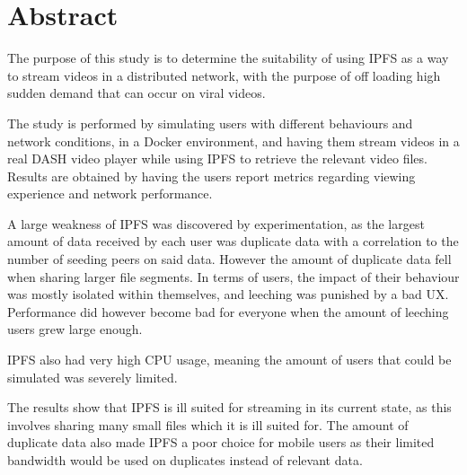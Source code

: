 \begingroup
\let\clearpage\relax
\let\cleardoublepage\relax
\let\cleardoublepage\relax

\chapter*{Abstract}
The purpose of this study is to determine the suitability of using \acs{IPFS} as a way to stream videos in a distributed network, with the purpose of off loading  high sudden demand that can occur on viral videos.

The study is performed by simulating users with different behaviours and network conditions, in a Docker environment, and having them stream videos in a real \acs{DASH} video player while using \acs{IPFS} to retrieve the relevant video files. Results are obtained by having the users report metrics regarding viewing experience and network performance.

A large weakness of \acs{IPFS} was discovered by experimentation, as the largest amount of data received by each user was duplicate data with a correlation to the number of seeding peers on said data. However the amount of duplicate data fell when sharing larger file segments. In terms of users, the impact of their behaviour was mostly isolated within themselves, and leeching was punished by a bad \acl{UX}. Performance did however become bad for everyone when the amount of leeching users grew large enough.

\acs{IPFS} also had very high \acs{CPU} usage, meaning the amount of users that could be simulated was severely limited.

The results show that \acs{IPFS} is ill suited for streaming in its current state, as this involves sharing many small files which it is ill suited for. The amount of duplicate data also made \acs{IPFS} a poor choice for mobile users as their limited bandwidth would be used on duplicates instead of relevant data.

\vfill

\endgroup			

\vfill